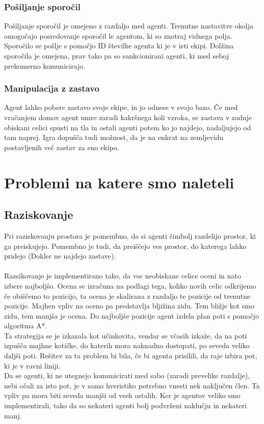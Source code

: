 \documentclass[12pt,a4paper,openany]{book}
\begin{document}
\subsection{Pošiljanje sporočil}
Pošiljanje sporočil je omejeno z razdaljo med agenti. Trenutne nastavitve okolja omogočajo posredovanje sporočil
 le agentom, ki so znotraj vidnega polja. Sporočilo se pošlje s pomočjo ID številke agenta ki je v isti ekipi.
 Dolžina sporočila je omejena, prav tako pa so sankcionirani agenti, ki med seboj prekomerno komunicirajo.

\subsection{Manipulacija z zastavo}
Agent lahko pobere zastavo svoje ekipe, in jo odnese v svojo bazo. Če med vračanjem domov agent umre zaradi
kakršnega koli vzroka, se zastava v zadnje obiskani celici spusti na tla in ostali agenti potem ko jo najdejo,
nadaljujejo od tam naprej. Igra dopušča tudi možnost, da je na enkrat na zemljevidu postavljenih več zastav za eno ekipo.



\chapter{Problemi na katere smo naleteli}

\section{Raziskovanje}
Pri raziskovanju prostora je pomembno, da si agenti čimbolj razdelijo prostor, ki ga preiskujejo. Pomembno je tudi,
da preiščejo ves prostor, do katerega lahko pridejo (Dokler ne najdejo zastave).\\
\\
Razsikovanje je implementirano tako, da vse neobiskane celice oceni in nato izbere najboljšo. Ocena se izračuna na 
podlagi tega, koliko novih celic odkrijemo če obiščemo to pozicijo, ta ocena je skalirana z razdaljo te pozicije od 
trenutne pozicije. Majhen vpliv na oceno pa predstavlja bljižina zidu. Tem bližje kot smo zidu, tem manjša je ocena. 
Do najboljše pozicije agent izdela plan poti s pomočjo algoritma A*.\\
Ta strategija se je izkazala kot učinkovita, vendar se včasih izkaže, da na poti izpušča majhne kotičke, do katerih 
mora naknadno dostopati, po seveda veliko daljši poti. Rešitev za ta problem bi bila, če bi agenta prisilili, da raje 
izbira pot, ki je v ravni liniji.\\
Da se agenti, ki ne utegnejo komunicirati med sabo (zaradi prevelike razdalje), nebi očali za isto pot, je v samo 
hveristiko potrebno vnesti nek naključen člen. Ta vpliv pa mora biti seveda manjši od vseh ostalih. Ker je 
agentov veliko smo implementirali, tako da so nekateri agenti bolj podvrženi naklučju in nekateri manj.
\end{document}
